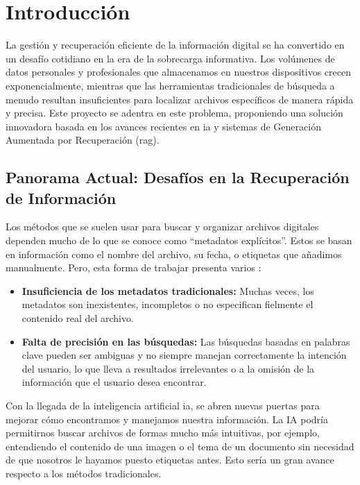 
\chapter{Introducción}

La gestión y recuperación eficiente de la información digital se ha convertido en un desafío cotidiano en la era de la sobrecarga informativa. Los volúmenes de datos personales y profesionales que almacenamos en nuestros dispositivos crecen exponencialmente, mientras que las herramientas tradicionales de búsqueda a menudo resultan insuficientes para localizar archivos específicos de manera rápida y precisa. Este proyecto se adentra en este problema, proponiendo una solución innovadora basada en los avances recientes en \gls{ia} y sistemas de Generación Aumentada por Recuperación (\gls{rag}). \citep{thomas_janssen_build_2024}

\section{Panorama Actual: Desafíos en la Recuperación de Información}
Los métodos que se suelen usar para buscar y organizar archivos digitales dependen mucho de lo que se conoce como ``metadatos explícitos''. Estos se basan en información como el nombre del archivo, su fecha, o etiquetas que añadimos manualmente. Pero, esta forma de trabajar presenta varios \citep{coffey_fundamental_2000}:
\begin{itemize}
    \item \textbf{Insuficiencia de los metadatos tradicionales:} Muchas veces, los metadatos son inexistentes, incompletos o no especifican fielmente el contenido real del archivo.
    \item \textbf{Falta de precisión en las búsquedas:} Las búsquedas basadas en palabras clave pueden ser ambiguas y no siempre manejan correctamente la intención del usuario, lo que lleva a resultados irrelevantes o a la omisión de la información que el usuario desea encontrar.
\end{itemize}
Con la llegada de la inteligencia artificial \gls{ia}, se abren nuevas puertas para mejorar cómo encontramos y manejamos nuestra información. La IA podría permitirnos buscar archivos de formas mucho más intuitivas, por ejemplo, entendiendo el contenido de una imagen o el tema de un documento sin necesidad de que nosotros le hayamos puesto etiquetas antes. Esto sería un gran avance respecto a los métodos tradicionales.

